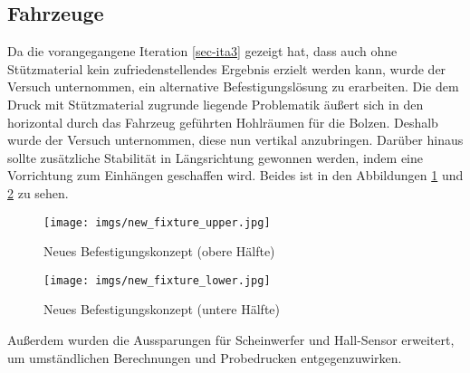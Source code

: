 \documentclass[.../Dokumentation.tex]{subfiles}
\begin{document}
\subsection{Fahrzeuge}\label{sec-ita4-cars}
Da die vorangegangene Iteration \ref{sec-ita3} gezeigt hat, dass auch ohne 
Stützmaterial kein zufriedenstellendes Ergebnis erzielt werden kann, 
wurde der Versuch unternommen, ein alternative Befestigungslösung zu erarbeiten. 
Die dem Druck mit Stützmaterial zugrunde liegende Problematik äußert sich in 
den horizontal durch das Fahrzeug geführten Hohlräumen für die Bolzen.
Deshalb wurde der Versuch unternommen, diese nun vertikal anzubringen.
Darüber hinaus sollte zusätzliche Stabilität in Längsrichtung gewonnen werden, 
indem eine Vorrichtung zum \grqq Einhängen\grqq{} geschaffen wird. 
Beides ist in den Abbildungen \ref{fig-new-fixture-upper} und 
\ref{fig-new-fixture-lower} zu sehen.
\begin{figure}[H]
\begin{center}
    \texttt{[image: imgs/new\_fixture\_upper.jpg]}
    \caption{Neues Befestigungskonzept (obere Hälfte)}
    \label{fig-new-fixture-upper}
\end{center}
\end{figure}
\noindent
\begin{figure}[H]
\begin{center}
    \texttt{[image: imgs/new\_fixture\_lower.jpg]}
    \caption{Neues Befestigungskonzept (untere Hälfte)}
    \label{fig-new-fixture-lower}
\end{center}
\end{figure}
\noindent 
Außerdem wurden die Aussparungen für Scheinwerfer und Hall-Sensor erweitert, 
um umständlichen Berechnungen und Probedrucken entgegenzuwirken.
\end{document}
